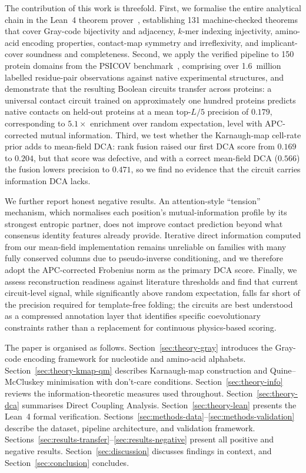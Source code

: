 The contribution of this work is threefold.  First, we formalise the entire
analytical chain in the Lean~4 theorem prover~\cite{lean4}, establishing
131 machine-checked theorems that cover Gray-code bijectivity and adjacency,
$k$-mer indexing injectivity, amino-acid encoding properties, contact-map
symmetry and irreflexivity, and implicant-cover soundness and completeness.
Second, we apply the verified pipeline to 150 protein domains from the PSICOV
benchmark~\cite{jones2012}, comprising over 1.6~million labelled residue-pair
observations against native experimental structures, and demonstrate that the
resulting Boolean circuits transfer across proteins: a universal contact
circuit trained on approximately one hundred proteins predicts native contacts
on held-out proteins at a mean top-$L/5$ precision of $0.179$, corresponding
to $5.1\times$ enrichment over random expectation, level with APC-corrected
mutual information.  Third, we test whether the Karnaugh-map cell-rate prior
adds to mean-field DCA: rank fusion raised our first DCA score from $0.169$ to
$0.204$, but that score was defective, and with a correct mean-field DCA
($0.566$) the fusion lowers precision to $0.471$, so we find no evidence that
the circuit carries information DCA lacks.

We further report honest negative results.  An attention-style ``tension''
mechanism, which normalises each position's mutual-information profile by its
strongest entropic partner, does not improve contact prediction beyond what
consensus identity features already provide.  Iterative direct information
computed from our mean-field implementation remains unreliable on families
with many fully conserved columns due to pseudo-inverse conditioning, and we
therefore adopt the APC-corrected Frobenius norm as the primary DCA score.
Finally, we assess reconstruction readiness against literature thresholds and
find that current circuit-level signal, while significantly above random
expectation, falls far short of the precision required for template-free
folding; the circuits are best understood as a compressed annotation layer
that identifies specific coevolutionary constraints rather than a replacement
for continuous physics-based scoring.

The paper is organised as follows.  Section~\ref{sec:theory-gray} introduces
the Gray-code encoding framework for nucleotide and amino-acid alphabets.
Section~\ref{sec:theory-kmap-qm} describes Karnaugh-map construction and
Quine--McCluskey minimisation with don't-care conditions.
Section~\ref{sec:theory-info} reviews the information-theoretic measures used
throughout.  Section~\ref{sec:theory-dca} summarises Direct Coupling Analysis.
Section~\ref{sec:theory-lean} presents the Lean~4 formal verification.
Sections~\ref{sec:methods-data}--\ref{sec:methods-validation} describe the
dataset, pipeline architecture, and validation framework.
Sections~\ref{sec:results-transfer}--\ref{sec:results-negative} present all
positive and negative results.  Section~\ref{sec:discussion} discusses findings
in context, and Section~\ref{sec:conclusion} concludes.
